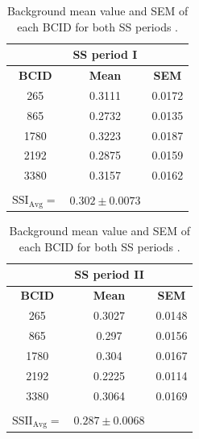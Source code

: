 \begin{table}[h!]
  \begin{center}
    \caption{Background mean value and SEM of each BCID for both SS periods .}
    \label{ss_per_bx}
    \begin{tabular}{|c | c | c | }
      \multicolumn{1}{c}{} & \multicolumn{1}{c}{\textbf{SS period I}} & \multicolumn{1}{c}{}  \\
      \hline
 \textbf{BCID}   & \textbf{Mean}   &  \textbf{SEM}\\
     \hline %
      265 & 0.3111 & 0.0172\\
      \hline
      865 & 0.2732 & 0.0135\\ 
      \hline
      1780 & 0.3223 & 0.0187\\ 
      \hline
      2192 & 0.2875 & 0.0159\\ 
      \hline
      3380 & 0.3157 & 0.0162\\ 
      \hline
      \multicolumn{1}{c}{} & \multicolumn{1}{c}{} & \multicolumn{1}{c}{}\\
      \multicolumn{1}{c}{$\text{SSI}_{\text{Avg}}=$} & \multicolumn{1}{l}{$0.302 \pm 0.0073$} & \multicolumn{1}{c}{}\\
    \end{tabular}
    \hspace{0.5cm}
    \begin{tabular}{|c | c | c | }
      \multicolumn{1}{c}{} & \multicolumn{1}{c}{\textbf{SS period II}} & \multicolumn{1}{c}{ }  \\
      \hline
 \textbf{BCID}   & \textbf{Mean}   &  \textbf{SEM}\\
     \hline %
      265 & 0.3027 & 0.0148\\
      \hline
      865 & 0.297 & 0.0156\\ 
      \hline
      1780 & 0.304 & 0.0167\\ 
      \hline
      2192 & 0.2225 & 0.0114\\ 
      \hline
      3380 & 0.3064 & 0.0169\\ 
      \hline
      \multicolumn{1}{c}{} & \multicolumn{1}{c}{} & \multicolumn{1}{c}{}\\
      \multicolumn{1}{c}{$\text{SSII}_{\text{Avg}}=$} & \multicolumn{1}{l}{$ 0.287 \pm 0.0068$} & \multicolumn{1}{c}{}
    \end{tabular}   
  \end{center}
\end{table}


